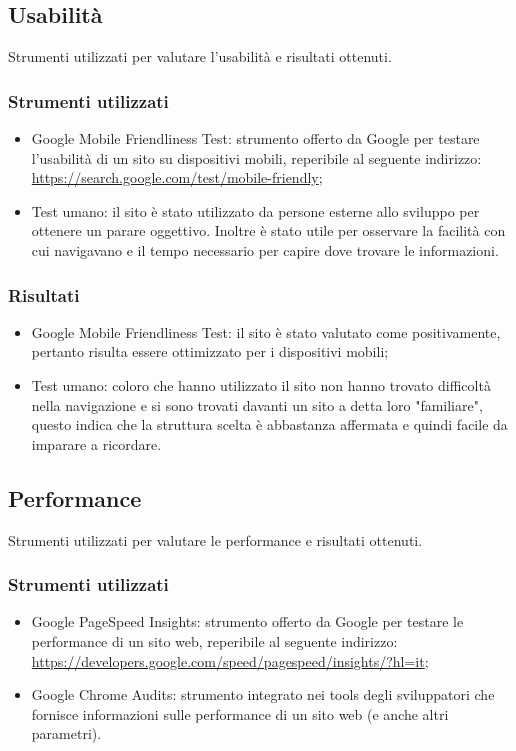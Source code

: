 \documentclass[12pt]{article}
\begin{document}
	\subsection{Usabilità}
	Strumenti utilizzati per valutare l'usabilità e risultati ottenuti.
	\subsubsection{Strumenti utilizzati}
		\begin{itemize}
			\item Google Mobile Friendliness Test: strumento offerto da Google per testare l'usabilità di un sito su dispositivi mobili, reperibile al seguente indirizzo: \url{https://search.google.com/test/mobile-friendly};
			\item Test umano: il sito è stato utilizzato da persone esterne allo sviluppo per ottenere un parare oggettivo. Inoltre è stato utile per osservare la facilità con cui navigavano e il tempo necessario per capire dove trovare le informazioni.
		\end{itemize}
	\subsubsection{Risultati}
		\begin{itemize}
			\item Google Mobile Friendliness Test: il sito è stato valutato come positivamente, pertanto risulta essere ottimizzato per i dispositivi mobili;
			\item Test umano: coloro che hanno utilizzato il sito non hanno trovato difficoltà nella navigazione e si sono trovati davanti un sito a detta loro "familiare", questo indica che la struttura scelta è abbastanza affermata e quindi facile da imparare a ricordare.
		\end{itemize}
	\subsection{Performance}
	Strumenti utilizzati per valutare le performance e risultati ottenuti.
	\subsubsection{Strumenti utilizzati}
		\begin{itemize}
			\item Google PageSpeed Insights: strumento offerto da Google per testare le performance di un sito web, reperibile al seguente indirizzo: \url{https://developers.google.com/speed/pagespeed/insights/?hl=it};
			\item Google Chrome Audits: strumento integrato nei tools degli sviluppatori che fornisce informazioni sulle performance di un sito web (e anche altri parametri).
		\end{itemize}
\end{document}
